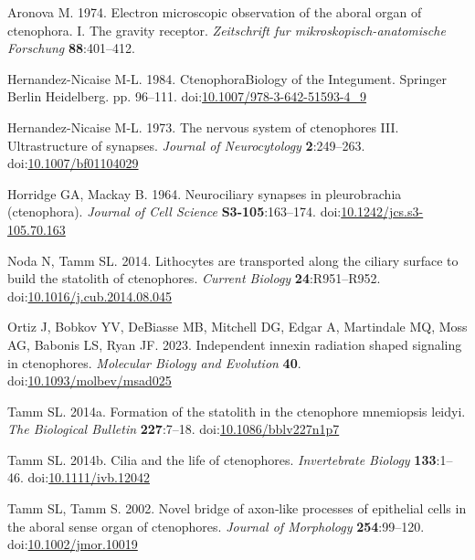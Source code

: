 \documentclass[
  11pt,
]{article}
\newlength{\cslhangindent}
\newenvironment{CSLReferences}[2] %
 {\begin{list}{}{%
  \setlength{\itemindent}{0pt}
  \setlength{\leftmargin}{0pt}
  \setlength{\parsep}{0pt}
  \ifodd #1
   \setlength{\leftmargin}{\cslhangindent}
   \setlength{\itemindent}{-1\cslhangindent}
  \fi
  \setlength{\itemsep}{#2\baselineskip}}}
 {\end{list}}
\begin{document}
\label{refs}
\begin{CSLReferences}{1}{0}
Aronova M. 1974. Electron microscopic observation of the aboral organ of
ctenophora. I. The gravity receptor. \emph{Zeitschrift fur
mikroskopisch-anatomische Forschung} \textbf{88}:401--412.

Hernandez-Nicaise M-L. 1984. CtenophoraBiology of the Integument.
Springer Berlin Heidelberg. pp. 96--111.
doi:\href{https://doi.org/10.1007/978-3-642-51593-4_9}{10.1007/978-3-642-51593-4\_9}

Hernandez-Nicaise M-L. 1973. The nervous system of ctenophores III.
Ultrastructure of synapses. \emph{Journal of Neurocytology}
\textbf{2}:249--263.
doi:\href{https://doi.org/10.1007/bf01104029}{10.1007/bf01104029}

Horridge GA, Mackay B. 1964. Neurociliary synapses in pleurobrachia
(ctenophora). \emph{Journal of Cell Science} \textbf{S3-105}:163--174.
doi:\href{https://doi.org/10.1242/jcs.s3-105.70.163}{10.1242/jcs.s3-105.70.163}

Noda N, Tamm SL. 2014. Lithocytes are transported along the ciliary
surface to build the statolith of ctenophores. \emph{Current Biology}
\textbf{24}:R951--R952.
doi:\href{https://doi.org/10.1016/j.cub.2014.08.045}{10.1016/j.cub.2014.08.045}

Ortiz J, Bobkov YV, DeBiasse MB, Mitchell DG, Edgar A, Martindale MQ,
Moss AG, Babonis LS, Ryan JF. 2023. Independent innexin radiation shaped
signaling in ctenophores. \emph{Molecular Biology and Evolution}
\textbf{40}.
doi:\href{https://doi.org/10.1093/molbev/msad025}{10.1093/molbev/msad025}

Tamm SL. 2014a. Formation of the statolith in the ctenophore mnemiopsis
leidyi. \emph{The Biological Bulletin} \textbf{227}:7--18.
doi:\href{https://doi.org/10.1086/bblv227n1p7}{10.1086/bblv227n1p7}

Tamm SL. 2014b. Cilia and the life of ctenophores. \emph{Invertebrate
Biology} \textbf{133}:1--46.
doi:\href{https://doi.org/10.1111/ivb.12042}{10.1111/ivb.12042}

Tamm SL, Tamm S. 2002. Novel bridge of axon‐like processes of epithelial
cells in the aboral sense organ of ctenophores. \emph{Journal of
Morphology} \textbf{254}:99--120.
doi:\href{https://doi.org/10.1002/jmor.10019}{10.1002/jmor.10019}

\end{CSLReferences}
\end{document}
